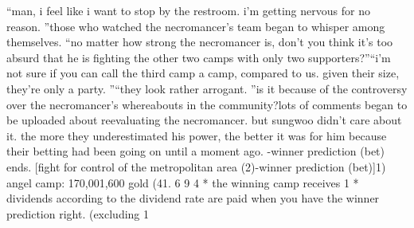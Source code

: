 “man, i feel like i want to stop by the restroom.
 i’m getting nervous for no reason.
”those who watched the necromancer’s team began to whisper among themselves.
“no matter how strong the necromancer is, don’t you think it’s too absurd that he is fighting the other two camps with only two supporters?”“i’m not sure if you can call the third camp a camp, compared to us.
 given their size, they’re only a party.
”“they look rather arrogant.
”is it because of the controversy over the necromancer’s whereabouts in the community?lots of comments began to be uploaded about reevaluating the necromancer.
but sungwoo didn’t care about it.
 the more they underestimated his power, the better it was for him because their betting had been going on until a moment ago.
-winner prediction (bet) ends.
[fight for control of the metropolitan area (2)-winner prediction (bet)]1) angel camp: 170,001,600 gold (41.
6%
9%
4%
* the winning camp receives 1%
* dividends according to the dividend rate are paid when you have the winner prediction right.
 (excluding 1%


 